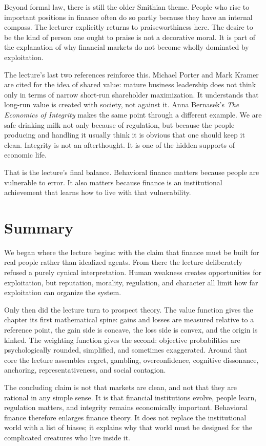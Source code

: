 Beyond formal law, there is still the older Smithian theme. People who rise to important positions in finance often do so partly because they have an internal compass. The lecturer explicitly returns to praiseworthiness here. The desire to be the kind of person one ought to praise is not a decorative moral. It is part of the explanation of why financial markets do not become wholly dominated by exploitation.

The lecture's last two references reinforce this. Michael Porter and Mark Kramer are cited for the idea of shared value: mature business leadership does not think only in terms of narrow short-run shareholder maximization. It understands that long-run value is created with society, not against it. Anna Bernasek's \emph{The Economics of Integrity} makes the same point through a different example. We are safe drinking milk not only because of regulation, but because the people producing and handling it usually think it is obvious that one should keep it clean. Integrity is not an afterthought. It is one of the hidden supports of economic life.

That is the lecture's final balance. Behavioral finance matters because people are vulnerable to error. It also matters because finance is an institutional achievement that learns how to live with that vulnerability.

\section{Summary}

We began where the lecture begins: with the claim that finance must be built for real people rather than idealized agents. From there the lecture deliberately refused a purely cynical interpretation. Human weakness creates opportunities for exploitation, but reputation, morality, regulation, and character all limit how far exploitation can organize the system.

Only then did the lecture turn to prospect theory. The value function gives the chapter its first mathematical spine: gains and losses are measured relative to a reference point, the gain side is concave, the loss side is convex, and the origin is kinked. The weighting function gives the second: objective probabilities are psychologically rounded, simplified, and sometimes exaggerated. Around that core the lecture assembles regret, gambling, overconfidence, cognitive dissonance, anchoring, representativeness, and social contagion.

The concluding claim is not that markets are clean, and not that they are rational in any simple sense. It is that financial institutions evolve, people learn, regulation matters, and integrity remains economically important. Behavioral finance therefore enlarges finance theory. It does not replace the institutional world with a list of biases; it explains why that world must be designed for the complicated creatures who live inside it.